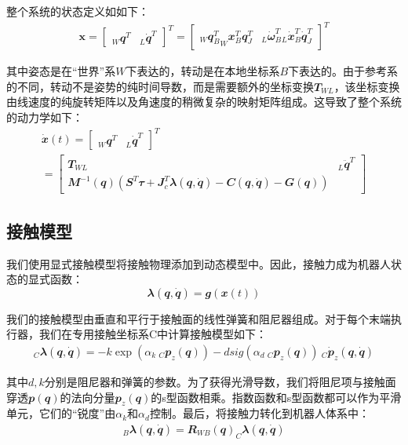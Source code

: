 整个系统的状态定义如如下：
\begin{align}
    \mathbf{x}=\begin{bmatrix} _W\mathbfit{q}^T & _L\mathbfit{\dot q}^T\end{bmatrix}^T
    =\begin{bmatrix} {_W \mathbfit{q}_B^T} _W\mathbfit{x}_B^T\mathbfit{q}_J^T & {_L\mathbfit{\dot \omega}_B^T} {_L\mathbfit{\dot x}_B^T} \mathbfit{\dot q}_J^T\end{bmatrix}^T
\end{align}

其中姿态是在“世界”系$W$下表达的，转动是在本地坐标系$B$下表达的。由于参考系的不同，转动不是姿势的纯时间导数，而是需要额外的坐标变换$\mathbfit{T}_{WL}$，该坐标变换由线速度的纯旋转矩阵以及角速度的稍微复杂的映射矩阵组成。这导致了整个系统的动力学如下：
\begin{align}
    \mathbfit{\dot x}(t)=\begin{bmatrix} _W\mathbfit{q}^T & _L\mathbfit{\dot q}^T\end{bmatrix}^T\\
    =\begin{bmatrix}\mathbfit{T}_{WL} & _L\mathbfit{\ddot q}^T\\ \mathbfit{M}^{-1}(\mathbfit{q})(\mathbfit{S}^T\mathbfit{\tau}+\mathbfit{J}_c^T\mathbfit{\lambda}(\mathbfit{q},\mathbfit{\dot q})-\mathbfit{C}(\mathbfit{q},\mathbfit{\dot q})-\mathbfit{G}(\mathbfit{q}))\end{bmatrix}
\end{align}

\subsection[接触模型]{接触模型}

我们使用显式接触模型将接触物理添加到动态模型中。因此，接触力成为机器人状态的显式函数：$$\mathbfit{\lambda}(\mathbfit{q},\mathbfit{\dot q})=\mathbfit{g}(\mathbfit{x}(t))$$

我们的接触模型由垂直和平行于接触面的线性弹簧和阻尼器组成。对于每个末端执行器，我们在专用接触坐标系C中计算接触模型如下：
\begin{align}
    _C\mathbfit{\lambda}(\mathbfit{q},\mathbfit{\dot q})=-k\exp(\alpha_k\ {_C\mathbfit{p}_z(\mathbfit{q})})-d sig(\alpha_d\ {_C\mathbfit{p}_z(\mathbfit{q})})\ {_C\mathbfit{\dot p}_z(\mathbfit{q},\mathbfit{\dot q})}
\end{align}

其中$d, k$分别是阻尼器和弹簧的参数。为了获得光滑导数，我们将阻尼项与接触面穿透$\mathbfit{p}(\mathbfit{q})$的法向分量$\mathbfit{p}_z(\mathbfit{q})$的s型函数相乘。指数函数和s型函数都可以作为平滑单元，它们的“锐度”由$\alpha_k$和$\alpha_d$控制。最后，将接触力转化到机器人体系中：
\begin{align}
    _B\mathbfit{\lambda}(\mathbfit{q},\mathbfit{\dot q})=\mathbfit{R}_{WB}(\mathbfit{q})_C\mathbfit{\lambda(\mathbfit{q},\mathbfit{\dot q})}
\end{align}

